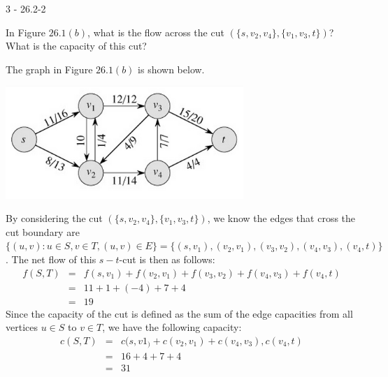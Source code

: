 \documentclass[11pt]{article}
\begin{document}
\begin{prob}{3 - 26.2-2}

In Figure $26.1(b)$, what is the flow across the cut $(\{s, v_2, v_4\}, \{v_1, v_3, t\})$? What is the capacity of this cut?
\end{prob}
\begin{sol}
The graph in Figure $26.1(b)$ is shown below.

\begin{center}
	\includegraphics[width=90mm]{graphpic.png}
\end{center}

By considering the cut $(\{s, v_2, v_4\}, \{v_1, v_3, t\})$, we know the edges that cross the cut boundary are $\{(u,v) : u \in S, v \in T, (u,v) \in E\} = \{(s, v_1), (v_2, v_1), (v_3, v_2), (v_4, v_3), (v_4, t)\}$. The net flow of this $s-t$-cut is then as follows:
\begin{eqnarray*}
f(S, T) & = & f(s, v_1) + f(v_2, v_1) + f(v_3, v_2) + f(v_4, v_3) + f(v_4, t) \\
& = & 11 + 1 + (-4) + 7 + 4 \\
& = & 19
\end{eqnarray*}
Since the capacity of the cut is defined as the sum of the edge capacities from all vertices $u \in S$ to $v \in T$, we have the following capacity:
\begin{eqnarray*}
c(S, T) & = & c(s,v1_) + c(v_2, v_1) + c(v_4, v_3), c(v_4, t) \\
& = & 16 + 4 + 7 + 4 \\
& = & 31
\end{eqnarray*}

\end{sol}
\end{document}
